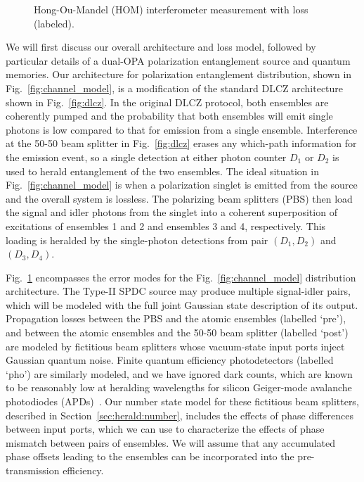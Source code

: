 \documentclass[aps,twocolumn,secnumarabic,amsmath,amssymb,pra,groupedaddress,
showpacs, showkeys]{revtex4-1}
\newcommand{\pna}[1]{\left(#1\right)}
\begin{document}
\begin{figure}[htb]
	\centering
	\resizebox{6.50in}{!}{}
	\caption{Hong-Ou-Mandel (HOM) interferometer measurement with loss (labeled).}
	\label{fig:channel_loss_model}
\end{figure}

We will first discuss our overall architecture and loss model, followed by
particular details of a dual-OPA polarization entanglement source and quantum
memories. Our architecture for polarization entanglement distribution, shown in
Fig.~\ref{fig:channel_model}, is a modification of the standard DLCZ
architecture shown in Fig.~\ref{fig:dlcz}. In the original DLCZ protocol, both
ensembles are coherently pumped and the probability that both ensembles will
emit single photons is low compared to that for emission from a single
ensemble. Interference at the 50-50 beam splitter in Fig.~\ref{fig:dlcz} erases
any which-path information for the emission event, so a single detection at
either photon counter $D_1$ or $D_2$ is used to herald entanglement of the two
ensembles. The ideal situation in Fig.~\ref{fig:channel_model} is when a
polarization singlet is emitted from the source and the overall system is
lossless. The polarizing beam splitters (PBS) then load the signal and idler
photons from the singlet into a coherent superposition of excitations of
ensembles 1 and 2 and ensembles 3 and 4, respectively. This loading is heralded
by the single-photon detections from pair $\pna{D_1, D_2}$ and $\pna{D_3,
  D_4}$.

Fig.~\ref{fig:channel_loss_model} encompasses the error modes for the
Fig.~\ref{fig:channel_model} distribution architecture. The Type-II SPDC source
may produce multiple signal-idler pairs, which will be modeled with the full
joint Gaussian state description of its output. Propagation losses between the
PBS and the atomic ensembles (labelled `pre'), and between the atomic ensembles
and the 50-50 beam splitter (labelled `post') are modeled by fictitious beam
splitters whose vacuum-state input ports inject Gaussian quantum noise. Finite
quantum efficiency photodetectors (labelled `pho') are similarly modeled, and
we have ignored dark counts, which are known to be reasonably low at heralding
wavelengths for silicon Geiger-mode avalanche photodiodes
(APDs)~\cite{Thomas2010}. Our number state model for these fictitious beam
splitters, described in Section~\ref{sec:herald:number}, includes the effects
of phase differences between input ports, which we can use to characterize the
effects of phase mismatch between pairs of ensembles. We will assume that any
accumulated phase offsets leading to the ensembles can be incorporated into the
pre-transmission efficiency.
\end{document}
